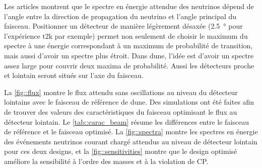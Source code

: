       Les articles \cite{Levy2010,McDonald2001,Itow2001} montrent que le spectre en énergie attendue des neutrinos dépend de l'angle entre la direction de propagation du neutrino et l'angle principal du faisceau. Positionner un détecteur de manière légèrement désaxée (\SI{2.5}{\degree} pour l'expérience \gls{t2k} par exemple) permet non seulement de choisir le maximum du spectre à une énergie correspondant à un maximum de probabilité de transition, mais aussi d'avoir un spectre plus étroit. Dans \gls{dune}, l'idée est d'avoir un spectre assez large pour couvrir deux maxima de probabilité. Aussi les détecteurs proche et lointain seront situés sur l'axe du faisceau.

      La \autoref{fig::flux} montre le flux attendu sans oscillations au niveau du détecteur lointains avec le faisceau de référence de \gls{dune}. Des simulations ont été faites\cite{Collaboration2015} afin de trouver des valeurs des caractéristiques du faisceau optimisant le flux au détecteur lointain. Le \autoref{tab::carac_beam} résume les différences entre le faisceau de référence et le faisceau optimisé. La \autoref{fig::spectra} montre les spectres en énergie des événements neutrinos courant chargé attendus au niveau de détecteur lointain pour ces deux designs, et la \autoref{fig::sensitivities} montre que le design optimisé améliore la sensibilité à l'ordre des masses et à la violation de CP.

        

